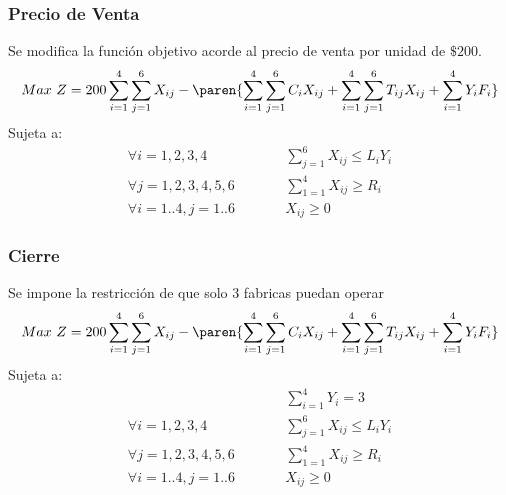 \begin{homeworkProblem}
\subsubsection{Precio de Venta}
Se modifica la función objetivo acorde al precio de venta por unidad de $\$200$.
\begin{align*}
    Max\ Z = 200\sum_{i=1}^{4}{ \sum_{j=1}^{6}{ X_{ij} } } - \paren{\sum_{i=1}^{4}{\sum_{j=1}^{6}{C_iX_{ij}}}   +
     \sum_{i=1}^{4}{\sum_{j=1}^{6}{T_{ij}X_{ij}}} + \sum_{i=1}^{4}{Y_iF_i}}
\end{align*}
Sujeta a:
\begin{align*}
    &\forall i=1,2,3,4&\quad\quad &\sum_{j=1}^{6}{X_{ij}}\leq L_iY_i& \\
    &\forall j=1,2,3,4,5,6&\quad\quad &\sum_{1=1}^{4}{X_{ij}}\geq R_i& \\
    &\forall i=1..4,j=1..6&\quad\quad &X_{ij}\geq 0&
\end{align*}


\subsubsection{Cierre}
Se impone la restricción de que solo 3 fabricas puedan operar
\begin{align*}
    Max\ Z = 200\sum_{i=1}^{4}{ \sum_{j=1}^{6}{ X_{ij} } } - \paren{\sum_{i=1}^{4}{\sum_{j=1}^{6}{C_iX_{ij}}}   +
     \sum_{i=1}^{4}{\sum_{j=1}^{6}{T_{ij}X_{ij}}} + \sum_{i=1}^{4}{Y_iF_i}}
\end{align*}
Sujeta a:
\begin{align*}
    && &\sum_{i=1}^{4}{Y_i} = 3\\
    &\forall i=1,2,3,4&\quad\quad &\sum_{j=1}^{6}{X_{ij}}\leq L_iY_i& \\
    &\forall j=1,2,3,4,5,6&\quad\quad &\sum_{1=1}^{4}{X_{ij}}\geq R_i& \\
    &\forall i=1..4,j=1..6&\quad\quad &X_{ij}\geq 0&
\end{align*}

\end{homeworkProblem}


